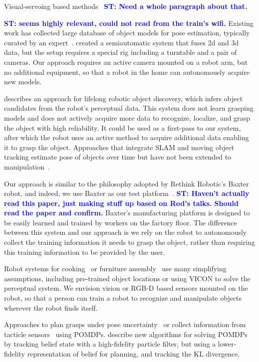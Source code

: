 \documentclass[graybox]{svmult}
\newcommand{\stnote}[1]{\textcolor{blue}{\textbf{ST: #1}}}
\begin{document}
Visual-servoing based methods~\citep{chaumette06} \stnote{Need a whole
  paragraph about that. }

\stnote{\citet{ciocarlie14} seems highly relevant, could not read from
  the train's wifi.}  Existing work has collected large database of
object models for pose estimation, typically curated by an
expert~\citep{lai11}.  \citet{kasper12} created a semiautomatic system
that fuses 2d and 3d data, but the setup requires a special rig
including a turntable and a pair of cameras.  Our approach requires an
active camera mounted on a robot arm, but no additional equipment, so
that a robot in the home can autonomously acquire new models.

\citet{collet14} describes an approach for lifelong robotic object
discovery, which infers object candidates from the robot's perceptual
data.  This system does not learn grasping models and does not
actively acquire more data to recognize, localize, and grasp the
object with high reliability.  It could be used as a first-pass to
our system, after which the robot uses an active method to acquire
additional data enabling it to grasp the object.  Approaches that
integrate SLAM and moving object tracking estimate pose of objects
over time but have not been extended to manipulation~\citep{wang07,
  gallagher09, salas-moreno13, selvatici08}.

Our approach is similar to the philosophy adopted by Rethink Robotic's
Baxter robot, and indeed, we use Baxter as our test
platform~\citep{fitzgerald13}.  \stnote{Haven't actually read this
  paper, just making stuff up based on Rod's talks.  Should read the
  paper and confirm.}  Baxter's manufacturing platform is designed to
be easily learned and trained by workers on the factory floor.  The
difference between this system and our approach is we rely on the
robot to autonomously collect the training information it needs to
grasp the object, rather than requiring this training information to
be provided by the user.


Robot systems for cooking~\citep{bollini12, beetz11} or furniture
assembly~\citep{knepper13} use many simplifying assumptions, including
pre-trained object locations or using VICON to solve the perceptual
system.  We envision vision or RGB-D based sensors mounted on the
robot, so that a person can train a robot to recognize and manipulate
objects wherever the robot finds itself.

Approaches to plan grasps under pose uncertainty~\citep{stulp11} or
collect information from tacticle sensors~\citep{hsiao10} using
POMDPs.  \citet{platt11} describe new algorithms for solving POMDPs by
tracking belief state with a high-fidelity particle filter, but using
a lower-fidelity representation of belief for planning, and tracking
the KL divergence.
\end{document}
